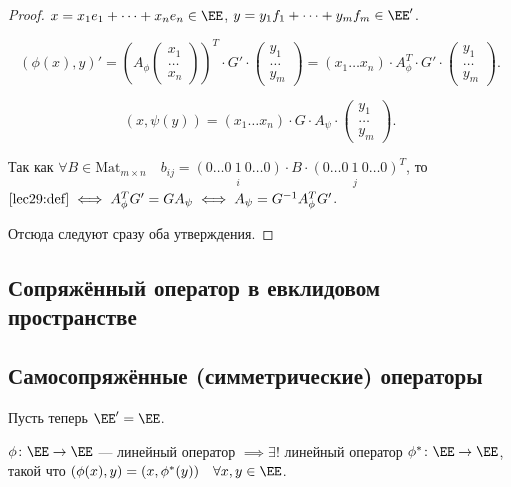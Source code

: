 \begin{proof}
    $x = x_1 e_1 + \dots + x_n e_n \in \EE$, $y = y_1 f_1 + \dots + y_m f_m \in \EE'$.

    \begin{equation*}
        (\phi(x), y)' = \left(A_\phi \begin{pmatrix} x_1 \\ \dots \\ x_n \end{pmatrix} \right)^{T} \cdot G' \cdot \begin{pmatrix} y_1 \\ \dots \\ y_m \end{pmatrix} = (x_1 \dots x_n) \cdot A_\phi^{T} \cdot G' \cdot \begin{pmatrix} y_1 \\ \dots \\ y_m \end{pmatrix}
    .\end{equation*}

    \begin{equation*}
        (x, \psi(y)) = (x_1 \dots x_n) \cdot G \cdot A_\psi \cdot \begin{pmatrix} y_1 \\ \dots \\ y_m \end{pmatrix}
    .\end{equation*}

    Так как $\forall B \in \text{Mat}_{m \times n} \quad b_{ij} = \underset{i}{(0 \dots 0 \ 1 \ 0 \dots 0)} \cdot B \cdot \underset{j}{(0 \dots 0 \ 1 \ 0 \dots 0)}^{T}$, то ${\eqref{lec29:def} \iff A_{\phi}^{T} G' = G A_\psi \iff A_\psi = G^{-1} A^{T}_\phi G'}$.

    Отсюда следуют сразу оба утверждения.
\end{proof}


\subsection{Сопряжённый оператор в евклидовом пространстве}

\subsection{Самосопряжённые (симметрические) операторы}

Пусть теперь $\EE' = \EE$.

$\phi \colon \EE \to \EE$ --- линейный оператор $ \implies \exists!$ линейный оператор $\phi^{*} \colon \EE \to \EE$, такой что $(\phi(x), y) = (x, \phi^{*}(y)) \quad \forall x, y \in \EE$.

